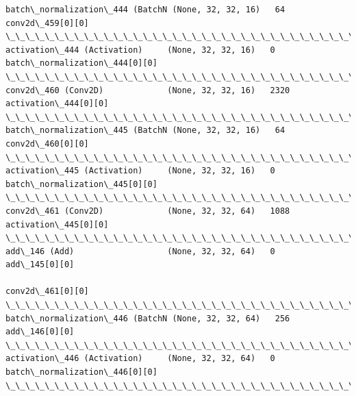 \documentclass[11pt]{article}
\begin{document}
\begin{Verbatim}[commandchars=\\\{\}]
batch\_normalization\_444 (BatchN (None, 32, 32, 16)   64          conv2d\_459[0][0]                 
\_\_\_\_\_\_\_\_\_\_\_\_\_\_\_\_\_\_\_\_\_\_\_\_\_\_\_\_\_\_\_\_\_\_\_\_\_\_\_\_\_\_\_\_\_\_\_\_\_\_\_\_\_\_\_\_\_\_\_\_\_\_\_\_\_\_\_\_\_\_\_\_\_\_\_\_\_\_\_\_\_\_\_\_\_\_\_\_\_\_\_\_\_\_\_\_\_\_
activation\_444 (Activation)     (None, 32, 32, 16)   0           batch\_normalization\_444[0][0]    
\_\_\_\_\_\_\_\_\_\_\_\_\_\_\_\_\_\_\_\_\_\_\_\_\_\_\_\_\_\_\_\_\_\_\_\_\_\_\_\_\_\_\_\_\_\_\_\_\_\_\_\_\_\_\_\_\_\_\_\_\_\_\_\_\_\_\_\_\_\_\_\_\_\_\_\_\_\_\_\_\_\_\_\_\_\_\_\_\_\_\_\_\_\_\_\_\_\_
conv2d\_460 (Conv2D)             (None, 32, 32, 16)   2320        activation\_444[0][0]             
\_\_\_\_\_\_\_\_\_\_\_\_\_\_\_\_\_\_\_\_\_\_\_\_\_\_\_\_\_\_\_\_\_\_\_\_\_\_\_\_\_\_\_\_\_\_\_\_\_\_\_\_\_\_\_\_\_\_\_\_\_\_\_\_\_\_\_\_\_\_\_\_\_\_\_\_\_\_\_\_\_\_\_\_\_\_\_\_\_\_\_\_\_\_\_\_\_\_
batch\_normalization\_445 (BatchN (None, 32, 32, 16)   64          conv2d\_460[0][0]                 
\_\_\_\_\_\_\_\_\_\_\_\_\_\_\_\_\_\_\_\_\_\_\_\_\_\_\_\_\_\_\_\_\_\_\_\_\_\_\_\_\_\_\_\_\_\_\_\_\_\_\_\_\_\_\_\_\_\_\_\_\_\_\_\_\_\_\_\_\_\_\_\_\_\_\_\_\_\_\_\_\_\_\_\_\_\_\_\_\_\_\_\_\_\_\_\_\_\_
activation\_445 (Activation)     (None, 32, 32, 16)   0           batch\_normalization\_445[0][0]    
\_\_\_\_\_\_\_\_\_\_\_\_\_\_\_\_\_\_\_\_\_\_\_\_\_\_\_\_\_\_\_\_\_\_\_\_\_\_\_\_\_\_\_\_\_\_\_\_\_\_\_\_\_\_\_\_\_\_\_\_\_\_\_\_\_\_\_\_\_\_\_\_\_\_\_\_\_\_\_\_\_\_\_\_\_\_\_\_\_\_\_\_\_\_\_\_\_\_
conv2d\_461 (Conv2D)             (None, 32, 32, 64)   1088        activation\_445[0][0]             
\_\_\_\_\_\_\_\_\_\_\_\_\_\_\_\_\_\_\_\_\_\_\_\_\_\_\_\_\_\_\_\_\_\_\_\_\_\_\_\_\_\_\_\_\_\_\_\_\_\_\_\_\_\_\_\_\_\_\_\_\_\_\_\_\_\_\_\_\_\_\_\_\_\_\_\_\_\_\_\_\_\_\_\_\_\_\_\_\_\_\_\_\_\_\_\_\_\_
add\_146 (Add)                   (None, 32, 32, 64)   0           add\_145[0][0]                    
                                                                 conv2d\_461[0][0]                 
\_\_\_\_\_\_\_\_\_\_\_\_\_\_\_\_\_\_\_\_\_\_\_\_\_\_\_\_\_\_\_\_\_\_\_\_\_\_\_\_\_\_\_\_\_\_\_\_\_\_\_\_\_\_\_\_\_\_\_\_\_\_\_\_\_\_\_\_\_\_\_\_\_\_\_\_\_\_\_\_\_\_\_\_\_\_\_\_\_\_\_\_\_\_\_\_\_\_
batch\_normalization\_446 (BatchN (None, 32, 32, 64)   256         add\_146[0][0]                    
\_\_\_\_\_\_\_\_\_\_\_\_\_\_\_\_\_\_\_\_\_\_\_\_\_\_\_\_\_\_\_\_\_\_\_\_\_\_\_\_\_\_\_\_\_\_\_\_\_\_\_\_\_\_\_\_\_\_\_\_\_\_\_\_\_\_\_\_\_\_\_\_\_\_\_\_\_\_\_\_\_\_\_\_\_\_\_\_\_\_\_\_\_\_\_\_\_\_
activation\_446 (Activation)     (None, 32, 32, 64)   0           batch\_normalization\_446[0][0]    
\_\_\_\_\_\_\_\_\_\_\_\_\_\_\_\_\_\_\_\_\_\_\_\_\_\_\_\_\_\_\_\_\_\_\_\_\_\_\_\_\_\_\_\_\_\_\_\_\_\_\_\_\_\_\_\_\_\_\_\_\_\_\_\_\_\_\_\_\_\_\_\_\_\_\_\_\_\_\_\_\_\_\_\_\_\_\_\_\_\_\_\_\_\_\_\_\_\_

\end{Verbatim}
\end{document}
